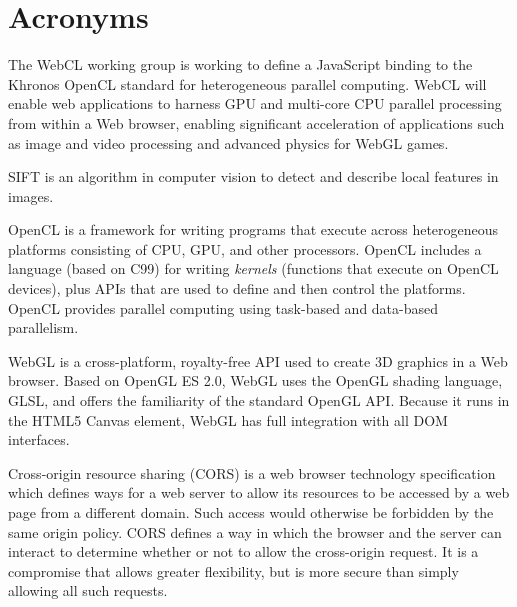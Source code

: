 \section*{Acronyms}
\begin{acronym}[WYSIWYG]


    {\small The WebCL working group is working to define a JavaScript binding to the Khronos \ac{OpenCL}
    standard for heterogeneous parallel computing. WebCL will enable web applications to harness GPU and
    multi-core CPU parallel processing from within a Web browser, enabling significant acceleration of
    applications such as image and video processing and advanced physics for \ac{WebGL} games.\par}


    {\small SIFT is an algorithm in computer vision to detect and describe local features in images.\par}



    {\small OpenCL is a framework for writing programs that execute across heterogeneous platforms consisting
    of CPU, GPU, and other processors. OpenCL includes a language (based on C99) for writing \emph{kernels}
    (functions that execute on OpenCL devices), plus APIs that are used to define and then control the platforms.
    OpenCL provides parallel computing using task-based and data-based parallelism.\par}


    {\small WebGL is a cross-platform, royalty-free API used to create 3D graphics in a Web browser. Based on
    OpenGL ES 2.0, WebGL uses the OpenGL shading language, GLSL, and offers the familiarity of the standard OpenGL API.
    Because it runs in the HTML5 Canvas element, WebGL has full integration with all DOM interfaces.\par}


    {\small Cross-origin resource sharing (CORS) is a web browser technology specification which defines ways
    for a web server to allow its resources to be accessed by a web page from a different domain. Such access
    would otherwise be forbidden by the same origin policy. CORS defines a way in which the browser and the
    server can interact to determine whether or not to allow the cross-origin request. It is a compromise
    that allows greater flexibility, but is more secure than simply allowing all such requests.\par}


\end{acronym}
